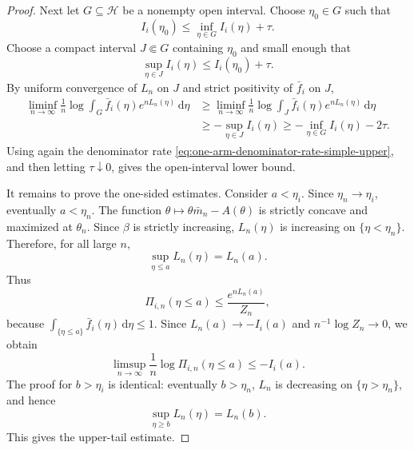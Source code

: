 \documentclass[10pt,a4paper]{amsart}
\newcommand{\dd}{\mathrm{d}}
\begin{document}
\begin{proof}
Next let \(G\subseteq\mathcal H\) be a nonempty open interval.  Choose
\(\eta_0\in G\) such that
\[
    I_i(\eta_0)\le \inf_{\eta\in G}I_i(\eta)+\tau.
\]
Choose a compact interval \(J\Subset G\) containing \(\eta_0\) and small enough
that
\[
    \sup_{\eta\in J}I_i(\eta)\le I_i(\eta_0)+\tau.
\]
By uniform convergence of \(L_n\) on \(J\) and strict positivity of
\(\bar f_i\) on \(J\),
\[
\begin{aligned}
    \liminf_{n\to\infty}
    \frac1n\log
    \int_G \bar f_i(\eta)e^{nL_n(\eta)}\,\dd\eta
    &\ge
    \liminf_{n\to\infty}
    \frac1n\log
    \int_J \bar f_i(\eta)e^{nL_n(\eta)}\,\dd\eta                  \\
    &\ge
    -\sup_{\eta\in J}I_i(\eta)
    \ge
    -\inf_{\eta\in G}I_i(\eta)-2\tau.
\end{aligned}
\]
Using again the denominator rate
\eqref{eq:one-arm-denominator-rate-simple-upper}, and then letting
\(\tau\downarrow0\), gives the open-interval lower bound.

It remains to prove the one-sided estimates.  Consider \(a<\eta_i\).  Since
\(\eta_n\to \eta_i\), eventually \(a<\eta_n\).  The function $\theta\mapsto \theta\bar m_n-A(\theta)$
is strictly concave and maximized at \(\theta_n\).  Since \(\beta\) is strictly
increasing, \(L_n(\eta)\) is increasing on \(\{\eta<\eta_n\}\).  Therefore, for all large
\(n\),
\[
    \sup_{\eta\le a}L_n(\eta)=L_n(a).
\]
Thus
\[
    \varPi_{i,n}(\eta\le a)
    \le
    \frac{e^{nL_n(a)}}{Z_n},
\]
because \(\int_{\{\eta\le a\}}\bar f_i(\eta)\,\dd\eta\le1\).
Since $L_n(a)\to -I_i(a)$
and \(n^{-1}\log Z_n\to0\), we obtain
\[
    \limsup_{n\to\infty}
    \frac1n\log\varPi_{i,n}(\eta\le a)
    \le
    -I_i(a).
\]
The proof for \(b>\eta_i\) is identical: eventually \(b>\eta_n\), \(L_n\) is
decreasing on \(\{\eta>\eta_n\}\), and hence
\[
    \sup_{\eta\ge b}L_n(\eta)=L_n(b).
\]
This gives the upper-tail estimate.

\end{proof}
\end{document}
